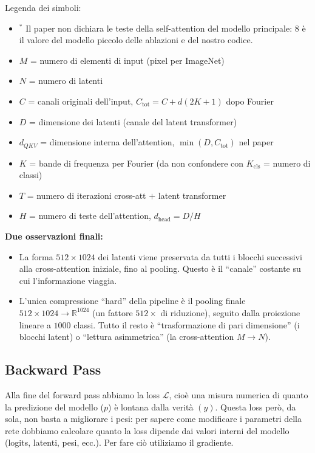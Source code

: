 \documentclass[
  11pt,
]{article}
\begin{document}
\begin{notabox}[title={\textbf{Checkpoint dimensioni finale --- fine \S1.4 (Forward Pass completo)}}]
\medskip
Legenda dei simboli:
\begin{itemize}\setlength\itemsep{0.1em}
\item $^{*}$ Il paper non dichiara le teste della self-attention del modello principale: 8 è il valore del modello piccolo delle ablazioni e del nostro codice.
\item $M$ = numero di elementi di input (pixel per ImageNet)
\item $N$ = numero di latenti
\item $C$ = canali originali dell'input, $C_{\text{tot}} = C + d(2K+1)$ dopo Fourier
\item $D$ = dimensione dei latenti (canale del latent transformer)
\item $d_{QKV}$ = dimensione interna dell'attention, $\min(D, C_{\text{tot}})$ nel paper
\item $K$ = bande di frequenza per Fourier (da non confondere con $K_{\text{cls}}$ = numero di classi)
\item $T$ = numero di iterazioni cross-att $+$ latent transformer
\item $H$ = numero di teste dell'attention, $d_{\text{head}} = D/H$
\end{itemize}

\medskip
\textbf{Due osservazioni finali:}
\begin{itemize}\setlength\itemsep{0.2em}
\item La forma $512 \times 1024$ dei latenti viene preservata da tutti i blocchi successivi alla cross-attention iniziale, fino al pooling. Questo è il ``canale'' costante su cui l'informazione viaggia.
\item L'unica compressione ``hard'' della pipeline è il pooling finale $512 \times 1024 \to \mathbb{R}^{1024}$ (un fattore $512\times$ di riduzione), seguito dalla proiezione lineare a $1000$ classi. Tutto il resto è ``trasformazione di pari dimensione'' (i blocchi latent) o ``lettura asimmetrica'' (la cross-attention $M \to N$).
\end{itemize}
\end{notabox}

\subsection{Backward Pass}
\label{sec:backward}

Alla fine del forward pass abbiamo la loss \(\mathcal{L}\), cioè una
misura numerica di quanto la predizione del modello (\(p\)) è lontana
dalla verità \((y)\). Questa loss però, da sola, non basta a migliorare
i pesi: per sapere come modificare i parametri della rete dobbiamo
calcolare quanto la loss dipende dai valori interni del modello (logits,
latenti, pesi, ecc.). Per fare ciò utiliziamo il gradiente.
\end{document}
